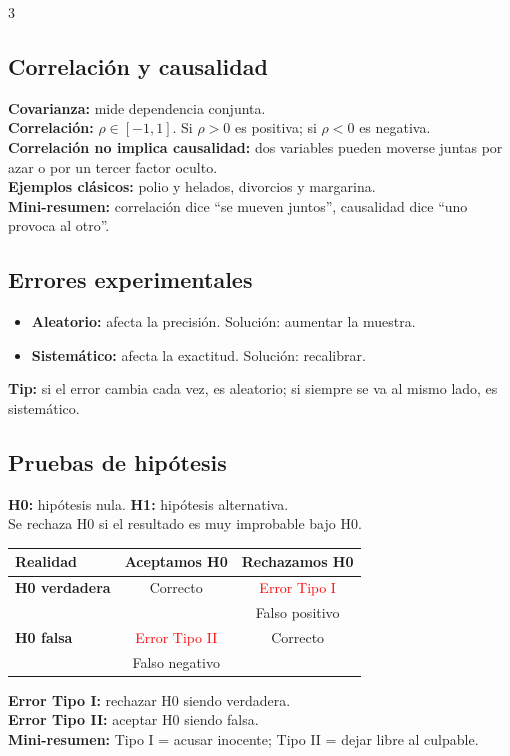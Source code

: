 \documentclass[9pt,landscape,letterpaper]{extarticle}
\begin{document}
\begin{multicols*}{3}
	\subsection{Correlación y causalidad}
	\textbf{Covarianza:} mide dependencia conjunta.\\
	\textbf{Correlación:} $\rho\in[-1,1]$. Si $\rho>0$ es positiva; si $\rho<0$ es negativa.\\
	\textbf{Correlación no implica causalidad:} dos variables pueden moverse juntas por azar o por un tercer factor oculto.\\
	\textbf{Ejemplos clásicos:} polio y helados, divorcios y margarina.\\
	\textbf{Mini-resumen:} correlación dice “se mueven juntos”, causalidad dice “uno provoca al otro”.

	\subsection{Errores experimentales}
	\begin{itemize}
		\item \textbf{Aleatorio:} afecta la precisión. Solución: aumentar la muestra.
		\item \textbf{Sistemático:} afecta la exactitud. Solución: recalibrar.
	\end{itemize}
	\textbf{Tip:} si el error cambia cada vez, es aleatorio; si siempre se va al mismo lado, es sistemático.

	\subsection{Pruebas de hipótesis}
	\textbf{H0:} hipótesis nula. \textbf{H1:} hipótesis alternativa.\\
	Se rechaza H0 si el resultado es muy improbable bajo H0.\\
	\begin{tcolorbox}[colback=white,colframe=black,boxrule=0.5pt,arc=0pt,left=2pt,right=2pt,top=2pt,bottom=2pt]
		\scriptsize
		\begin{tabular}{l|c|c}
			\textbf{Realidad}     & \textbf{Aceptamos H0}          & \textbf{Rechazamos H0}        \\
			\hline
			\textbf{H0 verdadera} & Correcto                       & \textcolor{red}{Error Tipo I} \\
			                      &                                & Falso positivo                \\
			\hline
			\textbf{H0 falsa}     & \textcolor{red}{Error Tipo II} & Correcto                      \\
			                      & Falso negativo                 &                               \\
		\end{tabular}
	\end{tcolorbox}
	\textbf{Error Tipo I:} rechazar H0 siendo verdadera.\\
	\textbf{Error Tipo II:} aceptar H0 siendo falsa.\\
	\textbf{Mini-resumen:} Tipo I = acusar inocente; Tipo II = dejar libre al culpable.


\end{multicols*}
\end{document}
